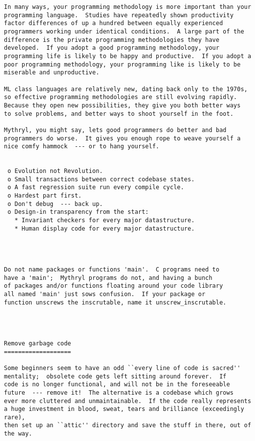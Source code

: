 \begin{verbatim}
In many ways, your programming methodology is more important than your 
programming language.  Studies have repeatedly shown productivity 
factor differences of up a hundred between equally experienced 
programmers working under identical conditions.  A large part of the 
difference is the private programming methodologies they have 
developed.  If you adopt a good programming methodology, your 
programming life is likely to be happy and productive.  If you adopt a 
poor programming methodology, your programming like is likely to be 
miserable and unproductive. 

ML class languages are relatively new, dating back only to the 1970s, 
so effective programming methodologies are still evolving rapidly. 
Because they open new possibilities, they give you both better ways 
to solve problems, and better ways to shoot yourself in the foot. 

Mythryl, you might say, lets good programmers do better and bad 
programmers do worse.  It gives you enough rope to weave yourself a 
nice comfy hammock  --- or to hang yourself. 


 o Evolution not Revolution. 
 o Small transactions between correct codebase states. 
 o A fast regression suite run every compile cycle. 
 o Hardest part first. 
 o Don't debug  --- back up. 
 o Design-in transparency from the start: 
   * Invariant checkers for every major datastructure. 
   * Human display code for every major datastructure. 




Do not name packages or functions 'main'.  C programs need to 
have a 'main';  Mythryl programs do not, and having a bunch 
of packages and/or functions floating around your code library 
all named 'main' just sows confusion.  If your package or 
function unscrews the inscrutable, name it unscrew_inscrutable. 




Remove garbage code 
=================== 

Some beginners seem to have an odd ``every line of code is sacred'' 
mentality;  obsolete code gets left sitting around forever.  If 
code is no longer functional, and will not be in the foreseeable 
future  --- remove it!  The alternative is a codebase which grows 
ever more cluttered and unmaintainable.  If the code really represents 
a huge investment in blood, sweat, tears and brilliance (exceedingly rare), 
then set up an ``attic'' directory and save the stuff in there, out of 
the way. 




\end{verbatim}
